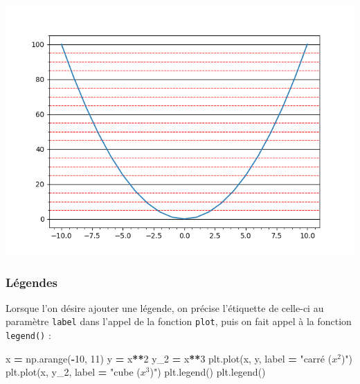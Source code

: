 \documentclass[12pt,]{book}
\newenvironment{Shaded}{\begin{snugshade}}{\end{snugshade}}
\newcommand{\DecValTok}[1]{\textcolor[rgb]{0.00,0.00,0.81}{#1}}
\newcommand{\StringTok}[1]{\textcolor[rgb]{0.31,0.60,0.02}{#1}}
\newcommand{\OperatorTok}[1]{\textcolor[rgb]{0.81,0.36,0.00}{\textbf{#1}}}
\newcommand{\NormalTok}[1]{#1}
\numberwithin{equation}{section}
\numberwithin{countremarque}{section}
\begin{document}
\begin{center}\includegraphics[width=9.03in]{figs/pyplot/plot_grid_minor} \end{center}

\subsubsection{Légendes}\label{legendes}

Lorsque l'on désire ajouter une légende, on précise l'étiquette de
celle-ci au paramètre \texttt{label} dans l'appel de la fonction
\texttt{plot}, puis on fait appel à la fonction \texttt{legend()} :

\begin{Shaded}
\begin{Highlighting}[]
\NormalTok{x }\OperatorTok{=}\NormalTok{ np.arange(}\OperatorTok{-}\DecValTok{10}\NormalTok{, }\DecValTok{11}\NormalTok{)}
\NormalTok{y }\OperatorTok{=}\NormalTok{ x}\OperatorTok{**}\DecValTok{2}
\NormalTok{y_2 }\OperatorTok{=}\NormalTok{ x}\OperatorTok{**}\DecValTok{3}
\NormalTok{plt.plot(x, y, label }\OperatorTok{=} \StringTok{"carré ($x^2$)"}\NormalTok{)}
\NormalTok{plt.plot(x, y_2, label }\OperatorTok{=} \StringTok{"cube ($x^3$)"}\NormalTok{)}
\NormalTok{plt.legend()}
\NormalTok{plt.legend()}
\end{Highlighting}
\end{Shaded}
\end{document}
